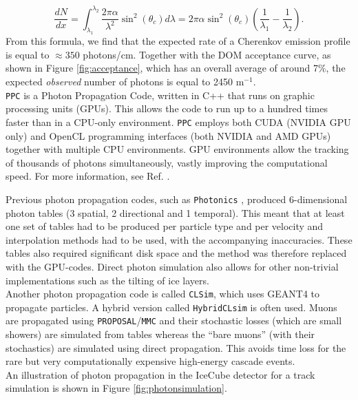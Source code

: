 \begin{equation}
\frac{dN}{dx} = \int_{\lambda_1}^{\lambda_2} \frac{2 \pi \alpha}{\lambda^2} \sin^2 \left(\theta_c\right) d\lambda = 2\pi \alpha \sin^2 \left(\theta_c\right) \left(\frac{1}{\lambda_1} -\frac{1}{\lambda_2}\right).
\end{equation}
From this formula, we find that the expected rate of a Cherenkov emission profile is equal to $\approx 350$ photons/cm. Together with the DOM acceptance curve, as shown in Figure \ref{fig:acceptance}, which has an overall average of around 7\%, the expected \textit{observed} number of photons is equal to 2450 m$^{-1}$.\\

\noindent \texttt{PPC} is a Photon Propagation Code, written in C++ that runs on graphic processing units (GPUs). This allows the code to run up to a hundred times faster than in a CPU-only environment. \texttt{PPC} employs both CUDA (NVIDIA GPU only) and OpenCL programming interfaces (both NVIDIA and AMD GPUs) together with multiple CPU environments.
GPU environments allow the tracking of thousands of photons simultaneously, vastly improving the computational speed. For more information, see Ref. \cite{dimaspice}.

Previous photon propagation codes, such as \texttt{Photonics}  \cite{Lundberg:2007mf}, produced 6-dimensional photon tables (3 spatial, 2 directional and 1 temporal). This meant that at least one set of tables had to be produced per particle type and per velocity and interpolation methods had to be used, with the accompanying inaccuracies. These tables also required significant disk space and the method was therefore replaced with the GPU-codes. Direct photon simulation also allows for other non-trivial implementations such as the tilting of ice layers.\\

\noindent Another photon propagation code is called \texttt{CLSim}, which uses GEANT4 to propagate particles. A hybrid version called \texttt{HybridCLsim} is often used. Muons are propagated using \texttt{PROPOSAL}/\texttt{MMC}  and their stochastic losses (which are small showers) are simulated from tables whereas the ``bare muons'' (with their stochastics) are simulated using direct propagation. This avoids time loss for the rare but very computationally expensive high-energy cascade events.\\

\noindent An illustration of photon propagation in the IceCube detector for a track simulation is shown in Figure \ref{fig:photonsimulation}.

